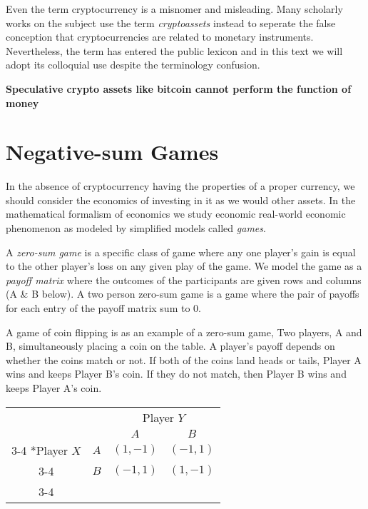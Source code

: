 Even the term cryptocurrency is a misnomer and misleading. Many scholarly works
on the subject use the term \textit{cryptoassets} instead to seperate the false
conception that cryptocurrencies are related to monetary instruments.
Nevertheless, the term has entered the public lexicon and in this text we will
adopt its colloquial use despite the terminology confusion.

\begin{infobox}
  \textbf{Speculative crypto assets like bitcoin cannot perform the function of
  money}
\end{infobox}

\section{Negative-sum Games}

In the absence of cryptocurrency having the properties of a proper currency, we
should consider the economics of investing in it as we would other assets. In
the mathematical formalism of economics we study economic real-world economic
phenomenon as modeled by simplified models called \textit{games}.

A \textit{zero-sum game} is a specific class of game where any one player's gain
is equal to the other player's loss on any given play of the game. We model the
game as a \textit{payoff matrix} where the outcomes of the participants are given
rows and columns (A \& B below). A two person zero-sum game is a game where the
pair of payoffs for each entry of the payoff matrix sum to 0.

A game of coin flipping is as an example of a zero-sum game, Two players, A and
B, simultaneously placing a coin on the table. A player's payoff depends on
whether the coins match or not. If both of the coins land heads or tails, Player
A wins and keeps Player B's coin. If they do not match, then Player B wins and
keeps Player A’s coin.

\begin{table}
  \setlength{\extrarowheight}{2pt}
  \begin{tabular}{cc|c|c|}
    & \multicolumn{1}{c}{} & \multicolumn{2}{c}{Player $Y$}\\
    & \multicolumn{1}{c}{} & \multicolumn{1}{c}{$A$}  & \multicolumn{1}{c}{$B$} \\\cline{3-4}
    \multirow{2}*{Player $X$}
    & $A$ & $(1,-1)$ & $(-1,1)$ \\\cline{3-4}
    & $B$ & $(-1,1)$ & $(1,-1)$    \\\cline{3-4}
  \end{tabular}
\end{table}

